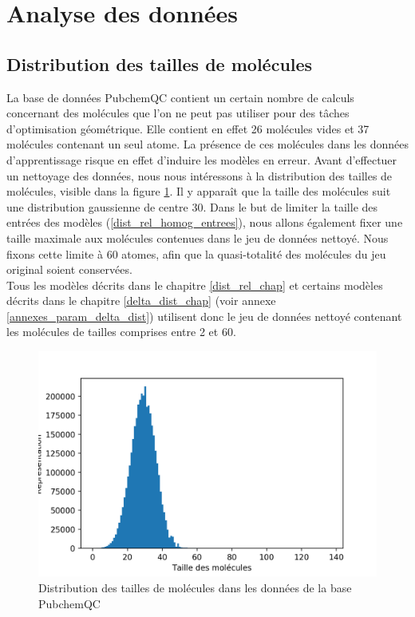 \section{Analyse des données}

\subsection{Distribution des tailles de molécules}

\label{donnees_distrib_tailles}

\par La base de données PubchemQC contient un certain nombre de calculs concernant des molécules que l'on ne peut pas utiliser pour des tâches d'optimisation géométrique. Elle contient en effet 26 molécules vides et 37 molécules contenant un seul atome. La présence de ces molécules dans les données d'apprentissage risque en effet d'induire les modèles en erreur.  Avant d'effectuer un nettoyage des données, nous nous intéressons à la distribution des tailles de molécules, visible dans la figure \ref{fig_distrib_tailles}. Il y apparaît que la taille des molécules suit une distribution gaussienne de centre 30. Dans le but de limiter la taille des entrées des modèles (\ref{dist_rel_homog_entrees}), nous allons également fixer une taille maximale aux molécules contenues dans le jeu de données nettoyé. Nous fixons cette limite à 60 atomes, afin que la quasi-totalité des molécules du jeu original soient conservées.\\
Tous les modèles décrits dans le chapitre \ref{dist_rel_chap} et certains modèles décrits dans le chapitre \ref{delta_dist_chap} (voir annexe \ref{annexes_param_delta_dist}) utilisent donc le jeu de données nettoyé contenant les molécules de tailles comprises entre 2 et 60.

\begin{figure}
	\centering
	\includegraphics[scale=0.8]{../figures/80_distribution_molecules.png}
	\caption{Distribution des tailles de molécules dans les données de la base PubchemQC}
	\label{fig_distrib_tailles}
\end{figure}

